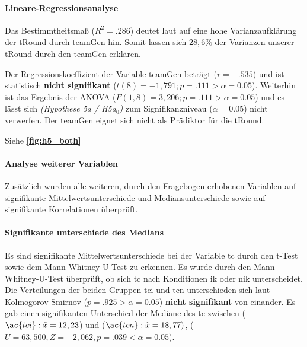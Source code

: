 \documentclass[a4paper,11pt]{article}%
\renewcommand{\\}{\vspace*{0.5\baselineskip} \newline}
\begin{document}
			\paragraph{Lineare-Regressionsanalyse}
Das Bestimmtheitsmaß ($R^{2} = .286$) deutet laut \citep{cohen2013statistical} auf eine hohe Varianzaufklärung der \ac{tRound} durch \ac{teamGen} hin. Somit lassen sich $28,6\%$ der Varianzen unserer \ac{tRound} durch den \ac{teamGen} erklären.

Der Regressionskoeffizient der Variable \ac{teamGen} beträgt ($r = -.535$) und ist statistisch \textbf{nicht signifikant} ($t(8) = -1,791; p = .111 > \alpha = 0.05$). \\
Weiterhin ist das Ergebnis der ANOVA ($F(1,8) = 3,206; p = .111 > \alpha = 0.05$) und es lässt sich \textit{(Hypothese 5a / H5a$_{0}$)} zum Signifikanzniveau ($\alpha = 0.05$) nicht verwerfen. \\
Der \ac{teamGen} eignet sich nicht als Prädiktor für die \ac{tRound}.

Siehe \textbf{\autoref{fig:h5_both}}

\newpage
\paragraph{Analyse weiterer Variablen}
Zusätzlich wurden alle weiteren, durch den Fragebogen erhobenen Variablen auf signifikante Mittelwertsunterschiede und Mediansunterschiede sowie auf signifikante Korrelationen überprüft.

\paragraph{Signifikante unterschiede des Medians}
Es sind signifikante Mittelwertsunterschiede bei der Variable \ac{tc} durch den t-Test sowie dem Mann-Whitney-U-Test zu erkennen.
Es wurde durch den Mann-Whitney-U-Test überprüft, ob sich \ac{tc} nach Konditionen \ac{ik} oder \ac{nik} unterscheidet. Die Verteilungen der beiden Gruppen \ac{tci} und \ac{tcn} unterschieden sich laut Kolmogorov-Smirnov ($p = .925 > \alpha = 0.05$) \textbf{nicht signifikant} von einander. Es gab einen signifikanten Unterschied der Mediane des \ac{tc} zwischen ($\ac{tci} : \tilde x = 12,23$) und ($\ac{tcn} : \tilde x = 18,77)$, ($U = 63,500, Z = -2,062, p = .039 < \alpha = 0.05$).
\end{document}

